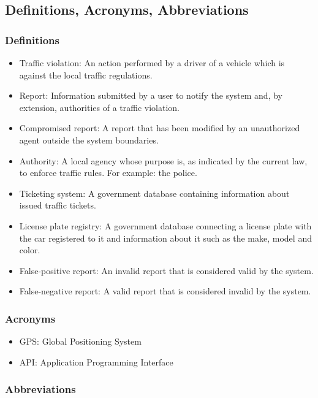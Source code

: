 \subsection{Definitions, Acronyms, Abbreviations}
\subsubsection{Definitions}

\begin{itemize}
    \item
    Traffic violation: An action performed by a driver of a vehicle which is against the local traffic regulations.
    \item
    Report: Information submitted by a user to notify the system and, by extension, authorities of a traffic violation.
    \item
    Compromised report: A report that has been modified by an unauthorized agent outside the system boundaries.
    \item
    Authority: A local agency whose purpose is, as indicated by the current law, to enforce traffic rules. For example: the police.
    \item
    Ticketing system: A government database containing information about issued traffic tickets.
    \item
    License plate registry: A government database connecting a license plate with the car registered to it and information about it such as the make, model and color.
    \item
    False-positive report: An invalid report that is considered valid by the system.
    \item
    False-negative report: A valid report that is considered invalid by the system.
\end{itemize}


\subsubsection{Acronyms}
\begin{itemize}
    \item
    GPS: Global Positioning System
    \item
    API: Application Programming Interface
\end{itemize}


\subsubsection{Abbreviations}

